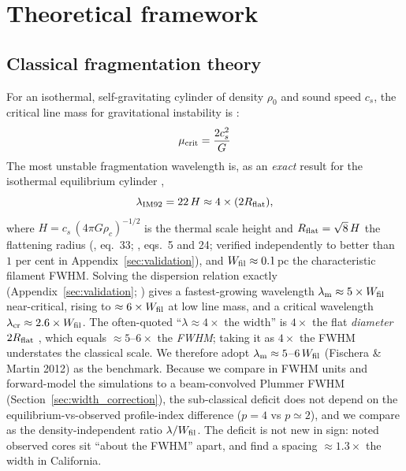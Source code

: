 \documentclass[usenatbib,twoside,twocolumn]{mnras}
\begin{document}
\section{Theoretical framework}
\label{sec:theory}

\subsection{Classical fragmentation theory}




For an isothermal, self-gravitating cylinder of density $\rho_0$ and sound speed $c_s$, the critical line mass for gravitational instability is \citep{Ostriker1964}:
\begin{equation}
\mu_{\rm crit} = \frac{2c_s^2}{G}
\label{eq:mucrit}
\end{equation}
The most unstable fragmentation wavelength is, as an \emph{exact} result for the isothermal equilibrium cylinder \citep{Inutsuka1992},
\begin{equation}
\lambda_{\rm IM92} = 22\,H \approx 4\times(2R_{\rm flat}),
\label{eq:lambdam}
\end{equation}
where $H = c_s\,(4\pi G\rho_c)^{-1/2}$ is the thermal scale height and $R_{\rm flat}=\sqrt8\,H$ the flattening radius (\citealt{Nagasawa1987}, eq.~33; \citealt{Fischera2012}, eqs.~5 and 24; verified independently to better than $1$ per cent in Appendix~\ref{sec:validation}), and $W_{\rm fil}\approx0.1$\,pc the characteristic filament FWHM. Solving the dispersion relation exactly (Appendix~\ref{sec:validation}; \citealt{Fischera2012}) gives a fastest-growing wavelength $\lambda_{\rm m}\approx5\times W_{\rm fil}$ near-critical, rising to $\approx6\times W_{\rm fil}$ at low line mass, and a critical wavelength $\lambda_{\rm cr}\approx2.6\times W_{\rm fil}$. The often-quoted ``$\lambda\approx4\times$ the width'' is $4\times$ the flat \emph{diameter} $2R_{\rm flat}$ \citep{Inutsuka1992}, which equals $\approx5$--$6\times$ the \emph{FWHM}; taking it as $4\times$ the FWHM understates the classical scale. We therefore adopt $\lambda_{\rm m}\approx5$--$6\,W_{\rm fil}$ (Fischera \& Martin 2012) as the benchmark. Because we compare in FWHM units and forward-model the simulations to a beam-convolved Plummer FWHM (Section~\ref{sec:width_correction}), the sub-classical deficit does not depend on the equilibrium-vs-observed profile-index difference ($p=4$ vs $p\simeq2$), and we compare as the density-independent ratio $\lambda/W_{\rm fil}$. The deficit is not new in sign: \citet{Fischera2012} noted observed cores sit ``about the FWHM'' apart, and \citet{Zhang2023cal} find a spacing $\approx1.3\times$ the width in California.
\end{document}
